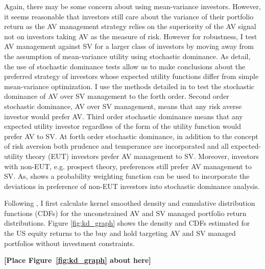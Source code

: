 Again, there may be some concern about using mean-variance investors. However, it seems reasonable that investors still care about the variance of their portfolio return as the AV management strategy relies on the superiority of the AV signal not on investors taking AV as the measure of risk. However for robustness, I test AV management against SV for a larger class of investors by moving away from the assumption of mean-variance utility using stochastic dominance. As \citet{hadar_rules_1969,hanoch_efficiency_1969,rothschild_increasing_1970,levy_experimental_2002} detail, the use of stochastic dominance tests allow us to make conclusions about the preferred strategy of investors whose expected utility functions differ from simple mean-variance optimization. I use the methods detailed in \citet{vinod_h.d._ranking_2004,vinod_hands-intermediate_2008} to test the stochastic dominance of AV over SV management to the forth order. Second order stochastic dominance, AV over SV management, means that any risk averse investor would prefer AV. \citep{mcfadden_testing_1989,valle_novel_2017} Third order stochastic dominance means that any expected utility investor regardless of the form of the utility function would prefer AV to SV. \citep{whitmore_third-degree_1970,chan_third_2016} At forth order stochastic dominance, in addition to the concept of risk aversion both prudence and temperance are incorporated and all expected-utility theory (EUT) investors prefer AV management to SV. \citep{kimball_standard_1993,noauthor_risk-aversion_nodate} Moreover, investors with non-EUT, e.g. prospect theory, preferences still prefer AV management to SV. \citep{kahneman_prospect_1979} As, \citet{prelec_probability_1998} shows a probability weighting function can be used to incorporate the deviations in preference of non-EUT investors into stochastic dominance analysis.  

Following \citet{vinod_hands-intermediate_2008}, I first calculate kernel smoothed density and cumulative distribution functions (CDFs) for the unconstrained AV and SV managed portfolio return distributions. Figure \ref{fig:kd_graph} shows the density and CDFs estimated for the US equity returns to the buy and hold targeting AV and SV managed portfolios without investment constraints.
\bigskip
\centerline{\bf [Place Figure~\ref{fig:kd_graph} about here]}
\bigskip

